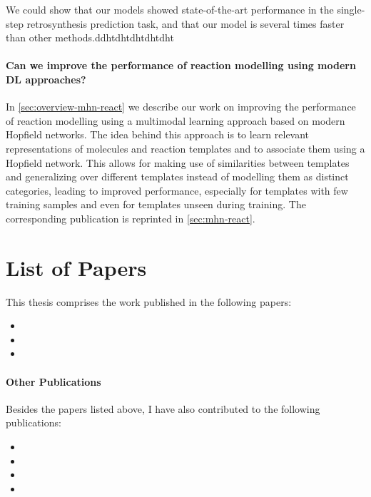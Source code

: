 We could show that our models showed state-of-the-art performance in
the single-step retrosynthesis prediction task, and that our model is several
times faster than other methods.ddhtdhtdhtdhtdht

\paragraph{Can we improve the performance of reaction modelling using modern DL approaches?}
In \cref{sec:overview-mhn-react} we describe our work on improving the performance
of reaction modelling using a multimodal learning approach based on modern
Hopfield networks. The idea behind this approach is to learn relevant representations
of molecules and reaction templates and to associate them using a Hopfield network.
This allows for making use of similarities between templates and generalizing over
different templates instead of modelling them as distinct categories, leading to
improved performance, especially for templates with few training samples and even
for templates unseen during training.
The corresponding publication is reprinted in \cref{sec:mhn-react}.

\section{List of Papers}
This thesis comprises the work published in the following papers:

\begin{itemize}
    \item {}
    \item {}
    \item {}
\end{itemize}

\paragraph{Other Publications} Besides the papers listed above, I have also
contributed to the following publications:

\begin{itemize}
    \item {}
    \item {}
    \item {}
    \item {}
\end{itemize}
